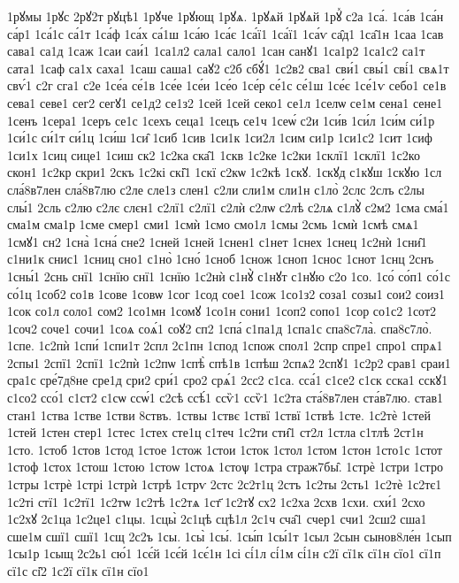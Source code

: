 {1рꙋмы
1рꙋс
2рꙋ2т
рꙋцѣ1
1рꙋче
1рꙋющ
1рꙋѧ.
1рꙋѧй
1рꙋѧй
1рꙋⷯ
с2а
1са́.
1са́в
1са́н
са́р1
1са́1с
са́1т
1са́ф
1са́х
са́1ш
1са́ю
1са́є
1са́ї1
1са́ї1
1са́ѵ
са̑д1
1са̑1н
1саа
1сав
сава1
са1д
1саж
1саи
саи́1
1са1л2
сала1
сало1
1сан
санꙋ1
1са1р2
1са1с2
са1т
сата1
1саф
са1х
саха1
1саш
саша1
саꙋ2
с2б
сбꙋ́1
1с2в2
сва1
сви́1
свы́1
сві́1
свѧ1т
свѵ́1
с2г
сга1
с2е
1се́а
се́1в
1се́е
1се́и
1се́о
1се́р
се́1с
се́1ш
1се́є
1се́1ѵ
себо1
се1в
сева1
севе1
сег2
сегꙋ1
се1д2
се1з2
1сей
1сей
секо1
се1л
1селѡ
се1м
сена1
сене1
1сенъ
1сера1
1серъ
се1с
1сехъ
сеца1
1сецъ
се1ч
1сеѡ́
с2и
1си́в
1си́л
1си́м
си́1р
1си́1с
си́1т
си́1ц
1си́ш
1си̑
1сиб
1сив
1си1к
1си2л
1сим
си1р
1си1с2
1сит
1сиф
1си1х
1сиц
сице1
1сиш
ск2
1с2ка
ска̑1
1скв
1с2ке
1с2ки
1склї1
1склї1
1с2ко
скон1
1с2кр
скри1
2скъ
1с2кі
скі̑1
1скї
с2кѡ
1с2кѣ
1скꙋ.
1скꙋд
с1кꙋш
1скꙋю
1сл
сла́8в7лен
сла́8в7лю
с2ле
сле1з
слен1
с2ли
сли1м
сли1н
с1ло̀
2слс
2слъ
с2лы
слы́1
2сль
с2лю
с2лє
слєн1
с2лї1
с2лї1
с2лѝ
с2лѡ
с2лѣ
с2лѧ
с1лꙋ̀
с2м2
1сма
сма́1
сма1м
сма1р
1сме
смер1
сми1
1смѝ
1смо
смо1л
1смы
2смь
1смѝ
1смѣ
смѧ1
1смꙋ1
сн2
1сна̀
1сна́
сне2
1сней
1сней
1снен1
с1нет
1снех
1снец
1с2нѝ
1сни̑1
с1ни1к
снис1
1сниц
сно1
с1но̀
1сно́
1сноб
1снож
1сноп
1снос
1снот
1снц
2снъ
1сны́1
2снь
снї1
1снїю
снї1
1снїю
1с2нѝ
с1нꙋ̀
с1нꙋт
с1нꙋю
с2о
1со.
1со́
со́п1
со́1с
со́1ц
1соб2
со1в
1сове
1совѡ
1сог
1сод
сое1
1сож
1со1з2
соза1
созы1
сои2
соиз1
1сок
со1л
соло1
сом2
1со1мн
1сомꙋ
1со1н
сони1
1соп2
сопо1
1сор
со1с2
1сот2
1соч2
соче1
сочи1
1соѧ
соѧ́1
соꙋ2
сп2
1спа́
с1па1д
1спа1с
спа8с7ла̀.
спа8с7ло̀.
1спе.
1с2пѝ
1спи́
1спи1т
2спл
2с1пн
1спод
1спож
спол1
2спр
спре1
спро1
спрѧ1
2спы1
2спї1
2спї1
1с2пѝ
1с2пѡ
1спѣ̀
спѣ1в
1спѣш
2спѧ2
2спꙋ1
1с2р2
срав1
сраи1
сра1с
сре́7д8не
сре1д
сри2
сри́1
сро2
срѧ́1
2сс2
с1са.
сса́1
с1се2
с1ск
сска1
сскꙋ1
с1со2
ссо́1
с1ст2
с1сѡ
ссѡ́1
с2сѣ
ссѣ́1
ссѷ1
ссѷ1
1с2та
ста́8в7лен
ста́в7лю.
став1
стан1
1ства
1стве
1стви
8ствъ.
1ствы
1ствє
1ствї
1ствї
1ствѣ
1сте.
1с2тѐ
1стей
1стей
1стен
стер1
1стес
1стех
сте1ц
с1теч
1с2ти
сти̑1
ст2л
1стла
с1тлѣ
2ст1н
1сто.
1стоб
1стов
1стод
1стое
1стож
1стои
1сток
1стол
1стом
1стон
1сто1с
1стот
1стоф
1стох
1стош
1стою
1стоѡ
1стоѧ
1стоѱ
1стра
страж7бы̑.
1стрѐ
1стри
1стро
1стры
1стрѐ
1стрі
1стрѝ
1стрѣ
1стрѵ
2стс
2с2т1ц
2стъ
1с2ты
2сть1
1с2тѐ
1с2тє1
1с2ті
стї1
1с2тї1
1с2тѡ
1с2тѣ
1с2тѧ
1ст҃
1с2тꙋ
сх2
1с2ха
2схв
1схи.
схи́1
2схо
1с2хꙋ
2с1ца
1с2це1
с1цы.
1сцы̀
2с1цѣ
сцѣ1л
2с1ч
сча̑1
счер1
счи1
2сш2
сша1
сше1м
сшї1
сшї1
1сщ
2с2ъ
1сы.
1сы̀
1сы́.
1сы́п
1сы́1т
1сыл
2сын
сынов8ле́н
1сып
1сы1р
1сыщ
2с2ь1
сю́1
1сє́й
1сє́й
1сє́1н
1сі
сі́1л
сі́1м
сі́1н
с2ї
сї1к
сї1н
сїо1
сї1п
сї1с
сі̑2
1с2ї
сї1к
сї1н
сїо1
}
